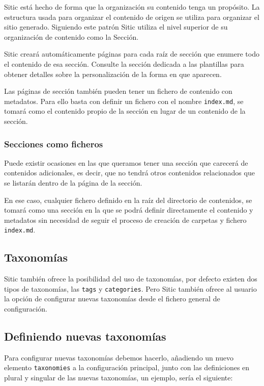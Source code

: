 Sitic está hecho de forma que la organización su contenido tenga un propósito. La estructura usada
para organizar el contenido de origen se utiliza para organizar el sitio generado. Siguiendo
este patrón Sitic utiliza el nivel superior de su organización de contenido como la Sección.

Sitic creará automáticamente páginas para cada raíz de sección que enumere todo el contenido
de esa sección. Consulte la sección dedicada a las plantillas para obtener detalles sobre
la personalización de la forma en que aparecen.

Las páginas de sección también pueden tener un fichero de contenido con metadatos. Para ello basta con
definir un fichero con el nombre \texttt{index.md}, se tomará como el contenido propio de la sección en
lugar de un contenido de la sección.

\subsubsection{Secciones como ficheros}

Puede existir ocasiones en las que queramos tener una sección que carecerá de contenidos adicionales,
es decir, que no tendrá otros contenidos relacionados que se listarán dentro de la página de la sección.

En ese caso, cualquier fichero definido en la raíz del directorio de contenidos, se tomará como una sección
en la que se podrá definir directamente el contenido y metadatos sin necesidad de seguir el proceso de creación
de carpetas y fichero \texttt{index.md}.

\subsection{Taxonomías}

Sitic también ofrece la posibilidad del uso de taxonomías, por defecto existen dos tipos de taxonomías,
las \texttt{tags} y \texttt{categories}. Pero Sitic también ofrece al usuario la opción de configurar
nuevas taxonomías desde el fichero general de configuración.

\subsection{Definiendo nuevas taxonomías}

Para configurar nuevas taxonomías debemos hacerlo, añadiendo un nuevo elemento \texttt{taxonomies}
a la configuración principal, junto
con las definiciones en plural y singular de las nuevas taxonomías, un ejemplo, sería el siguiente:

